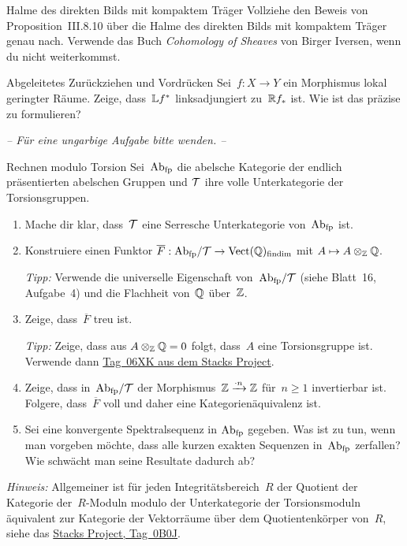 \documentclass{uebblatt}
\begin{document}
\begin{aufgabe}{Halme des direkten Bilds mit kompaktem Träger}
Vollziehe den Beweis von Proposition~III.8.10 über die Halme des direkten Bilds
mit kompaktem Träger genau nach. Verwende das Buch \emph{Cohomology of Sheaves}
von Birger Iversen, wenn du nicht weiterkommst.
\end{aufgabe}

\begin{aufgabe}{Abgeleitetes Zurückziehen und Vordrücken}
Sei~$f : X \to Y$ ein Morphismus lokal geringter Räume. Zeige, dass~$\mathbb{L} f^*$
linksadjungiert zu~$\mathbb{R} f_*$ ist. Wie ist das präzise zu formulieren?
\end{aufgabe}

\begin{center}\emph{-- Für eine ungarbige Aufgabe bitte wenden. --}\end{center}

\newpage

\begin{aufgabe}{Rechnen modulo Torsion}
Sei~$\mathrm{Ab}_\text{fp}$ die abelsche Kategorie der endlich präsentierten abelschen
Gruppen und $\mathcal{T}$ ihre volle Unterkategorie der Torsionsgruppen.
\begin{enumerate}
\item Mache dir klar, dass~$\mathcal{T}$ eine Serresche Unterkategorie
von~$\mathrm{Ab}_\text{fp}$ ist.
\item Konstruiere einen Funktor $\overline{F} : \mathrm{Ab}_\text{fp}/\mathcal{T} \to
\mathrm{Vect}(\mathbb{Q})_\text{findim}$ mit $A \mapsto A \otimes_{\mathbb{Z}} \mathbb{Q}$.

{\tiny\emph{Tipp:} Verwende die universelle Eigenschaft von~$\mathrm{Ab}_\text{fp}/\mathcal{T}$
(siehe Blatt~16, Aufgabe~4) und die Flachheit von~$\mathbb{Q}$ über~$\mathbb{Z}$.\par}

\item Zeige, dass~$\overline{F}$ treu ist.

{\tiny\emph{Tipp:} Zeige, dass aus $A \otimes_{\mathbb{Z}} \mathbb{Q} = 0$ folgt,
dass~$A$ eine Torsionsgruppe ist. Verwende dann
\href{http://stacks.math.columbia.edu/tag/06XK}{Tag~06XK aus dem Stacks
Project}.\par}
\item Zeige, dass in~$\mathrm{Ab}_\text{fp}/\mathcal{T}$ der Morphismus~$\mathbb{Z} \xrightarrow{\cdot
n} \mathbb{Z}$ für~$n \geq 1$ invertierbar ist. Folgere, dass~$\overline{F}$
voll und daher eine Kategorienäquivalenz ist.
\item Sei eine konvergente Spektralsequenz in $\mathrm{Ab}_\text{fp}$ gegeben. Was ist
zu tun, wenn man vorgeben möchte, dass alle kurzen exakten Sequenzen
in~$\mathrm{Ab}_\text{fp}$ zerfallen? Wie schwächt man seine Resultate dadurch ab?
\end{enumerate}

{\tiny\emph{Hinweis:} Allgemeiner ist für jeden Integritätsbereich~$R$ der
Quotient der Kategorie der~$R$-Moduln modulo der Unterkategorie der
Torsionsmoduln äquivalent zur Kategorie der Vektorräume über dem
Quotientenkörper von~$R$, siehe das
\href{http://stacks.math.columbia.edu/tag/0B0J}{Stacks Project, Tag~0B0J}.\par}
\end{aufgabe}
\end{document}
